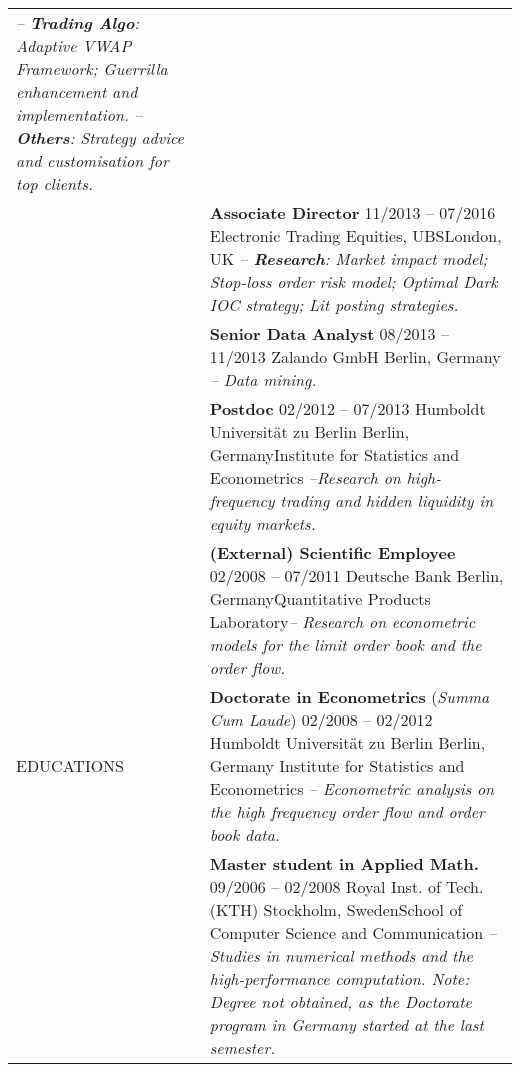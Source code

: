 \documentclass[a4paper,10pt]{article}
\begin{document}
\begin{longtable}[h]{p{}p{}}
  \emph{-- \textbf{Trading Algo}: Adaptive VWAP Framework; Guerrilla enhancement and implementation.}\newline 
    \emph{-- \textbf{Others}: Strategy advice and customisation for top clients.}\\ 
  & \textbf{Associate Director} \hfill 11/2013 -- 07/2016 \newline Electronic Trading Equities, UBS\hfill London, UK\newline  
  \emph{-- \textbf{Research}: Market impact model; Stop-loss order risk model; Optimal Dark IOC strategy; Lit posting strategies.}\\
  & \textbf{Senior Data Analyst} \hfill 08/2013 -- 11/2013 \newline Zalando GmbH \hfill Berlin, Germany \newline  
  \emph{-- Data mining.} \\
  & \textbf{Postdoc} \hfill 02/2012 -- 07/2013 \newline Humboldt Universit\"at zu Berlin \hfill Berlin, Germany\newline Institute for Statistics and Econometrics \newline \emph{--Research on high-frequency trading and hidden liquidity in equity markets.} \\
  & \textbf{(External) Scientific Employee} \hfill 02/2008 -- 07/2011 \newline Deutsche Bank \hfill Berlin, Germany\newline Quantitative Products Laboratory\newline \emph{-- Research on econometric models for the limit order book and the order flow.} \\
  EDUCATIONS
& \textbf{Doctorate in Econometrics} \small{(\emph{Summa Cum Laude})} \hfill 02/2008 -- 02/2012 \newline Humboldt Universit\"at zu Berlin \hfill Berlin, Germany \newline Institute for Statistics and Econometrics\newline
\emph{-- Econometric analysis on the high frequency order flow and order book data.}\\
  & \textbf{Master student in Applied Math.} \hfill 09/2006 -- 02/2008 \newline Royal Inst. of Tech. (KTH) \hfill Stockholm, Sweden\newline School of Computer Science and Communication \newline
  \emph{-- Studies in numerical methods and the high-performance computation. Note: Degree not obtained, as the Doctorate program in Germany started at the last semester.} \\

\end{longtable}
\end{document}

